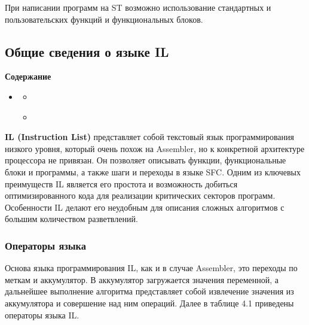 \documentclass[letterpaper,10pt,russian]{sphinxmanual}
\begin{document}
При написании программ на ST возможно использование стандартных и
пользовательских функций и функциональных блоков.


\subsection{Общие сведения о языке IL}
\label{iec_guide/il_guide::doc}\label{iec_guide/il_guide:il}
\begin{sphinxShadowBox}
\textbf{Содержание}

\medskip

\begin{itemize}
\item {} 
\label{iec_guide/il_guide:id4}{\hyperref[iec_guide/il_guide:il]{}}
\begin{itemize}
\item {} 
\label{iec_guide/il_guide:id5}{\hyperref[iec_guide/il_guide:id2]{}}

\item {} 
\label{iec_guide/il_guide:id6}{\hyperref[iec_guide/il_guide:id3]{}}

\end{itemize}

\end{itemize}
\end{sphinxShadowBox}

\textbf{IL (Instruction List)} представляет собой текстовый язык программирования
низкого уровня, который очень похож на Assembler, но к конкретной
архитектуре процессора не привязан. Он позволяет описывать функции,
функциональные блоки и программы, а также шаги и переходы в языке SFC.
Одним из ключевых преимуществ IL является его простота и возможность
добиться оптимизированного кода для реализации критических секторов
программ. Особенности IL делают его неудобным для описания сложных
алгоритмов с большим количеством разветвлений.


\subsubsection{Операторы языка}
\label{iec_guide/il_guide:id2}
Основа языка программирования IL, как и в случае Assembler, это переходы
по меткам и аккумулятор. В аккумулятор загружается значения переменной,
а дальнейшее выполнение алгоритма представляет собой извлечение значения
из аккумулятора и совершение над ним операций. Далее в таблице 4.1
приведены операторы языка IL.
\end{document}
